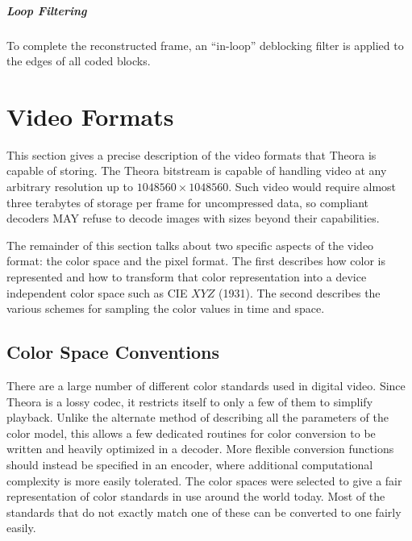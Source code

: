 \documentclass[11pt,letterpaper]{book}
\numberwithin{equation}{chapter}
\numberwithin{figure}{chapter}
\numberwithin{table}{chapter}
\begin{document}
\paragraph{Loop Filtering}

To complete the reconstructed frame, an ``in-loop'' deblocking filter is
 applied to the edges of all coded blocks.


\chapter{Video Formats}

This section gives a precise description of the video formats that Theora is
 capable of storing.
The Theora bitstream is capable of handling video at any arbitrary resolution
 up to $1048560\times 1048560$.
Such video would require almost three terabytes of storage per frame for
 uncompressed data, so compliant decoders MAY refuse to decode images with
 sizes beyond their capabilities.

The remainder of this section talks about two specific aspects of the video
 format: the color space and the pixel format.
The first describes how color is represented and how to transform that color
 representation into a device independent color space such as CIE $XYZ$ (1931).
The second describes the various schemes for sampling the color values in time
 and space.

\section{Color Space Conventions}

There are a large number of different color standards used in digital video.
Since Theora is a lossy codec, it restricts itself to only a few of them to
 simplify playback.
Unlike the alternate method of describing all the parameters of the color
 model, this allows a few dedicated routines for color conversion to be written
 and heavily optimized in a decoder.
More flexible conversion functions should instead be specified in an encoder,
 where additional computational complexity is more easily tolerated.
The color spaces were selected to give a fair representation of color standards
 in use around the world today.
Most of the standards that do not exactly match one of these can be converted
 to one fairly easily.
\end{document}

